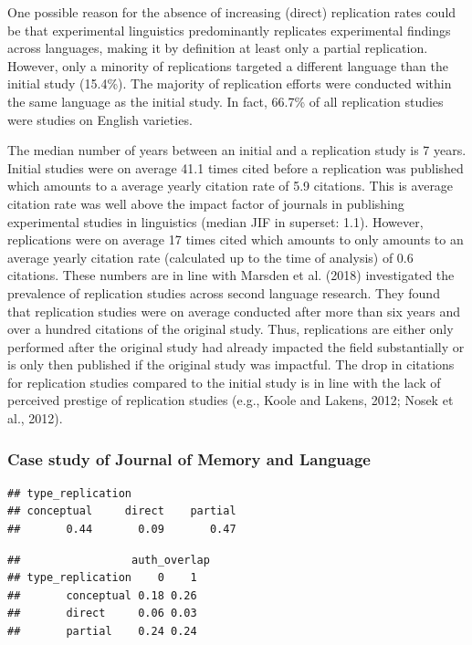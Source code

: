 \documentclass[]{elsarticle} %
\begin{document}
One possible reason for the absence of increasing (direct) replication
rates could be that experimental linguistics predominantly replicates
experimental findings across languages, making it by definition at least
only a partial replication. However, only a minority of replications
targeted a different language than the initial study (15.4\%). The
majority of replication efforts were conducted within the same language
as the initial study. In fact, 66.7\% of all replication studies were
studies on English varieties.

The median number of years between an initial and a replication study is
7 years. Initial studies were on average 41.1 times cited before a
replication was published which amounts to a average yearly citation
rate of 5.9 citations. This is average citation rate was well above the
impact factor of journals in publishing experimental studies in
linguistics (median JIF in superset: 1.1). However, replications were on
average 17 times cited which amounts to only amounts to an average
yearly citation rate (calculated up to the time of analysis) of 0.6
citations. These numbers are in line with Marsden et al. (2018)
investigated the prevalence of replication studies across second
language research. They found that replication studies were on average
conducted after more than six years and over a hundred citations of the
original study. Thus, replications are either only performed after the
original study had already impacted the field substantially or is only
then published if the original study was impactful. The drop in
citations for replication studies compared to the initial study is in
line with the lack of perceived prestige of replication studies (e.g.,
Koole and Lakens, 2012; Nosek et al., 2012).

\hypertarget{case-study-of-journal-of-memory-and-language}{%
\subsubsection{Case study of Journal of Memory and
Language}\label{case-study-of-journal-of-memory-and-language}}

\begin{verbatim}
## type_replication
## conceptual     direct    partial 
##       0.44       0.09       0.47
\end{verbatim}

\begin{verbatim}
##                 auth_overlap
## type_replication    0    1
##       conceptual 0.18 0.26
##       direct     0.06 0.03
##       partial    0.24 0.24
\end{verbatim}
\end{document}
